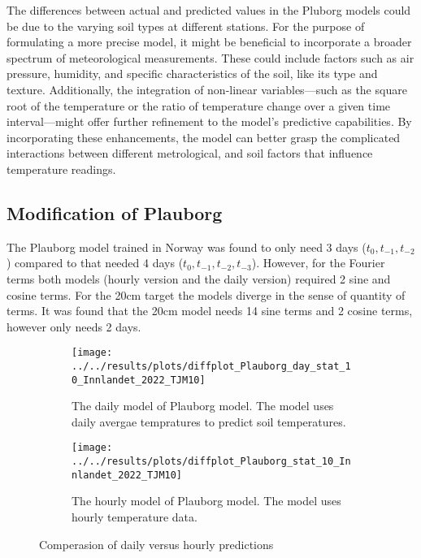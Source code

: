 The differences between actual and predicted values in the Pluborg models could be due to the varying soil types at different stations. For the purpose of formulating a more precise model, it might be beneficial to incorporate a broader spectrum of meteorological measurements. These could include factors such as air pressure, humidity, and specific characteristics of the soil, like its type and texture. Additionally, the integration of non-linear variables—such as the square root of the temperature or the ratio of temperature change over a given time interval—might offer further refinement to the model’s predictive capabilities. By incorporating these enhancements, the model can better grasp the complicated interactions between different metrological, and soil factors that influence temperature readings.

\subsection{Modification of Plauborg}

The Plauborg model trained in Norway was found to only need 3 days ($t_0,t_{-1},t_{-2}$) compared to \cite{plauborg_simple_2002} that needed 4 days ($t_0,t_{-1},t_{-2},t_{-3}$). However, for the Fourier terms both models (hourly version and the daily version) required 2 sine and cosine terms. For the 20cm target the models diverge in the sense of quantity of terms. It was found that the 20cm model needs 14 sine terms and 2 cosine terms, however only needs 2 days.
\begin{figure}[H]
	\begin{subfigure}{\textwidth}
		\centering
		\texttt{[image: ../../results/plots/diffplot\_Plauborg\_day\_stat\_10\_Innlandet\_2022\_TJM10]}
		\caption[Plauborg daily TJM10]{The daily model of Plauborg model. The model uses daily avergae tempratures to predict soil temperatures.}
		\label{fig:diffplotplauborgdaystat10innlandet2022tjm10}
	\end{subfigure}
	\begin{subfigure}{\textwidth}
		\centering
		\texttt{[image: ../../results/plots/diffplot\_Plauborg\_stat\_10\_Innlandet\_2022\_TJM10]}
		\caption[Plauborg hourly TJM10]{The hourly model of Plauborg model. The model uses hourly temperature data.}
		\label{fig:diffplotplauborgstat10innlandet2022tjm10}
	\end{subfigure}
	\caption{Comperasion of daily versus hourly predictions}
\end{figure}

